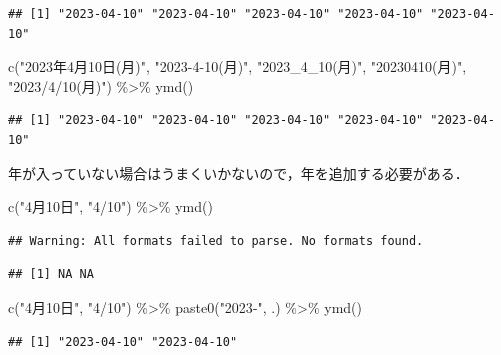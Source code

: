 \documentclass[
]{article}
\newenvironment{Shaded}{\begin{snugshade}}{\end{snugshade}}
\newcommand{\FunctionTok}[1]{\textcolor[rgb]{0.00,0.00,0.00}{#1}}
\newcommand{\NormalTok}[1]{#1}
\newcommand{\SpecialCharTok}[1]{\textcolor[rgb]{0.00,0.00,0.00}{#1}}
\newcommand{\StringTok}[1]{\textcolor[rgb]{0.31,0.60,0.02}{#1}}
\begin{document}
\begin{verbatim}
## [1] "2023-04-10" "2023-04-10" "2023-04-10" "2023-04-10" "2023-04-10"
\end{verbatim}

\begin{Shaded}
\begin{Highlighting}[]
\FunctionTok{c}\NormalTok{(}\StringTok{"2023年4月10日(月)"}\NormalTok{, }\StringTok{"2023{-}4{-}10(月)"}\NormalTok{, }\StringTok{"2023\_4\_10(月)"}\NormalTok{, }\StringTok{"20230410(月)"}\NormalTok{, }\StringTok{"2023/4/10(月)"}\NormalTok{) }\SpecialCharTok{\%\textgreater{}\%}
  \FunctionTok{ymd}\NormalTok{()}
\end{Highlighting}
\end{Shaded}

\begin{verbatim}
## [1] "2023-04-10" "2023-04-10" "2023-04-10" "2023-04-10" "2023-04-10"
\end{verbatim}

年が入っていない場合はうまくいかないので，年を追加する必要がある．

\begin{Shaded}
\begin{Highlighting}[]
\FunctionTok{c}\NormalTok{(}\StringTok{"4月10日"}\NormalTok{, }\StringTok{"4/10"}\NormalTok{) }\SpecialCharTok{\%\textgreater{}\%}
  \FunctionTok{ymd}\NormalTok{()}
\end{Highlighting}
\end{Shaded}

\begin{verbatim}
## Warning: All formats failed to parse. No formats found.
\end{verbatim}

\begin{verbatim}
## [1] NA NA
\end{verbatim}

\begin{Shaded}
\begin{Highlighting}[]
\FunctionTok{c}\NormalTok{(}\StringTok{"4月10日"}\NormalTok{, }\StringTok{"4/10"}\NormalTok{) }\SpecialCharTok{\%\textgreater{}\%}
  \FunctionTok{paste0}\NormalTok{(}\StringTok{"2023{-}"}\NormalTok{, .) }\SpecialCharTok{\%\textgreater{}\%}
  \FunctionTok{ymd}\NormalTok{()}
\end{Highlighting}
\end{Shaded}

\begin{verbatim}
## [1] "2023-04-10" "2023-04-10"
\end{verbatim}
\end{document}
